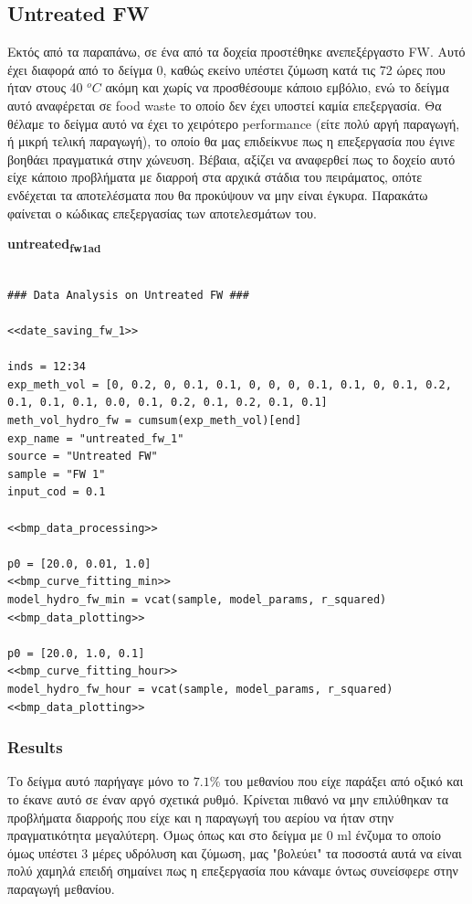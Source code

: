 \documentclass[11pt]{article}
\begin{document}
\subsection{Untreated FW}
\label{sec:org0909be7}
Εκτός από τα παραπάνω, σε ένα από τα δοχεία προστέθηκε ανεπεξέργαστο FW. Αυτό έχει διαφορά από το δείγμα 0, καθώς εκείνο υπέστει ζύμωση κατά τις 72 ώρες που ήταν στους 40 \(^oC\) ακόμη και χωρίς να προσθέσουμε κάποιο εμβόλιο, ενώ το δείγμα αυτό αναφέρεται σε food waste το οποίο δεν έχει υποστεί καμία επεξεργασία. Θα θέλαμε το δείγμα αυτό να έχει το χειρότερο performance (είτε πολύ αργή παραγωγή, ή μικρή τελική παραγωγή), το οποίο θα μας επιδείκνυε πως η επεξεργασία που έγινε βοηθάει πραγματικά στην χώνευση. Βέβαια, αξίζει να αναφερθεί πως το δοχείο αυτό είχε κάποιο προβλήματα με διαρροή στα αρχικά στάδια του πειράματος, οπότε ενδέχεται τα αποτελέσματα που θα προκύψουν να μην είναι έγκυρα. Παρακάτω φαίνεται ο κώδικας επεξεργασίας των αποτελεσμάτων του.

\textbf{untreated\textsubscript{fw}\textsubscript{1}\textsubscript{ad}}
\begin{verbatim}

### Data Analysis on Untreated FW ###

<<date_saving_fw_1>>

inds = 12:34
exp_meth_vol = [0, 0.2, 0, 0.1, 0.1, 0, 0, 0, 0.1, 0.1, 0, 0.1, 0.2, 0.1, 0.1, 0.1, 0.0, 0.1, 0.2, 0.1, 0.2, 0.1, 0.1]
meth_vol_hydro_fw = cumsum(exp_meth_vol)[end]
exp_name = "untreated_fw_1"
source = "Untreated FW"
sample = "FW 1"
input_cod = 0.1

<<bmp_data_processing>>

p0 = [20.0, 0.01, 1.0]
<<bmp_curve_fitting_min>>
model_hydro_fw_min = vcat(sample, model_params, r_squared)
<<bmp_data_plotting>>

p0 = [20.0, 1.0, 0.1]
<<bmp_curve_fitting_hour>>
model_hydro_fw_hour = vcat(sample, model_params, r_squared)
<<bmp_data_plotting>>
\end{verbatim}

\subsubsection{Results}
\label{sec:orgb935ce8}
Το δείγμα αυτό παρήγαγε μόνο το \(7.1 \%\) του μεθανίου που είχε παράξει από οξικό και το έκανε αυτό σε έναν αργό σχετικά ρυθμό. Κρίνεται πιθανό να μην επιλύθηκαν τα προβλήματα διαρροής που είχε και η παραγωγή του αερίου να ήταν στην πραγματικότητα μεγαλύτερη. Όμως όπως και στο δείγμα με 0 ml ένζυμα το οποίο όμως υπέστει 3 μέρες υδρόλυση και ζύμωση, μας "βολεύει" τα ποσοστά αυτά να είναι πολύ χαμηλά επειδή σημαίνει πως η επεξεργασία που κάναμε όντως συνείσφερε στην παραγωγή μεθανίου.
\end{document}
